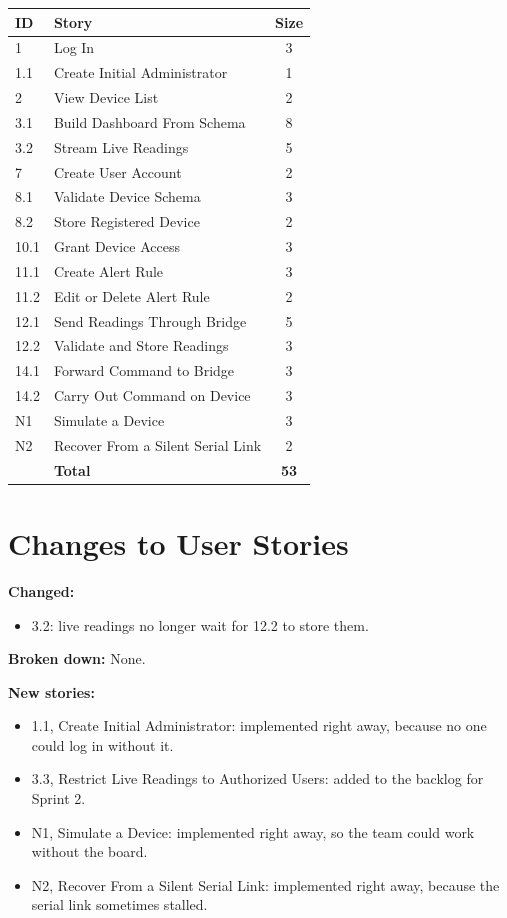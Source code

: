 \documentclass[11pt]{article}
\begin{document}
\begin{center}
\begin{tabularx}{0.7\textwidth}{@{} l X c @{}}
\toprule
\textbf{ID} & \textbf{Story} & \textbf{Size} \\
\midrule
1 & Log In & 3 \\
1.1 & Create Initial Administrator & 1 \\
2 & View Device List & 2 \\
3.1 & Build Dashboard From Schema & 8 \\
3.2 & Stream Live Readings & 5 \\
7 & Create User Account & 2 \\
8.1 & Validate Device Schema & 3 \\
8.2 & Store Registered Device & 2 \\
10.1 & Grant Device Access & 3 \\
11.1 & Create Alert Rule & 3 \\
11.2 & Edit or Delete Alert Rule & 2 \\
12.1 & Send Readings Through Bridge & 5 \\
12.2 & Validate and Store Readings & 3 \\
14.1 & Forward Command to Bridge & 3 \\
14.2 & Carry Out Command on Device & 3 \\
N1 & Simulate a Device & 3 \\
N2 & Recover From a Silent Serial Link & 2 \\
\midrule
 & \textbf{Total} & \textbf{53} \\
\bottomrule
\end{tabularx}
\end{center}

\newpage

\section{Changes to User Stories}

\textbf{Changed:}
\begin{itemize}[leftmargin=1.5em]
\item 3.2: live readings no longer wait for 12.2 to store them.
\end{itemize}

\textbf{Broken down:} None.

\textbf{New stories:}
\begin{itemize}[leftmargin=1.5em]
\item 1.1, Create Initial Administrator: implemented right away, because no one could log in without it.
\item 3.3, Restrict Live Readings to Authorized Users: added to the backlog for Sprint 2.
\item N1, Simulate a Device: implemented right away, so the team could work without the board.
\item N2, Recover From a Silent Serial Link: implemented right away, because the serial link sometimes stalled.
\end{itemize}
\end{document}
